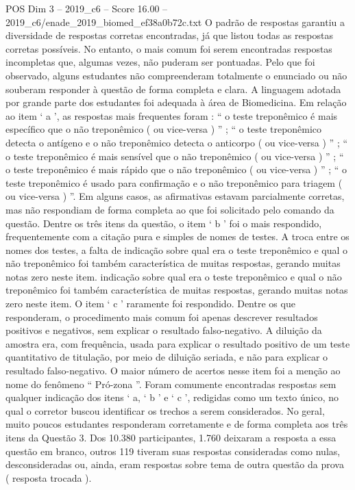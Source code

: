 \begin{textsample}{POS Dim 3 – 2019\_c6 – Score 16.00 – 2019\_c6/enade\_2019\_biomed\_ef38a0b72c.txt}
O padrão de respostas garantiu a diversidade de respostas corretas encontradas, já que listou todas as respostas corretas possíveis.
No entanto, o mais comum foi serem encontradas respostas incompletas que, algumas vezes, não puderam ser pontuadas.
Pelo que foi observado, alguns estudantes não compreenderam totalmente o enunciado ou não souberam responder à questão de forma completa e clara.
A linguagem adotada por grande parte dos estudantes foi adequada à área de Biomedicina.
Em relação ao item ‘ a ’, as respostas mais frequentes foram : “ o teste treponêmico é mais específico que o não treponêmico ( ou vice-versa ) ” ; “ o teste treponêmico detecta o antígeno e o não treponêmico detecta o anticorpo ( ou vice-versa ) ” ; “ o teste treponêmico é mais sensível que o não treponêmico ( ou vice-versa ) ” ; “ o teste treponêmico é mais rápido que o não treponêmico ( ou vice-versa ) ” ; “ o teste treponêmico é usado para confirmação e o não treponêmico para triagem ( ou vice-versa ) ”.
Em alguns casos, as afirmativas estavam parcialmente corretas, mas não respondiam de forma completa ao que foi solicitado pelo comando da questão.
Dentre os três itens da questão, o item ‘ b ’ foi o mais respondido, frequentemente com a citação pura e simples de nomes de testes.
A troca entre os nomes dos testes, a falta de indicação sobre qual era o teste treponêmico e qual o não treponêmico foi também característica de muitas respostas, gerando muitas notas zero neste item. indicação sobre qual era o teste treponêmico e qual o não treponêmico foi também característica de muitas respostas, gerando muitas notas zero neste item.
O item ‘ c ’ raramente foi respondido.
Dentre os que responderam, o procedimento mais comum foi apenas descrever resultados positivos e negativos, sem explicar o resultado falso-negativo.
A diluição da amostra era, com frequência, usada para explicar o resultado positivo de um teste quantitativo de titulação, por meio de diluição seriada, e não para explicar o resultado falso-negativo.
O maior número de acertos nesse item foi a menção ao nome do fenômeno “ Pró-zona ”.
Foram comumente encontradas respostas sem qualquer indicação dos itens ‘ a, ‘ b ’ e ‘ c ’, redigidas como um texto único, no qual o corretor buscou identificar os trechos a serem considerados.
No geral, muito poucos estudantes responderam corretamente e de forma completa aos três itens da Questão 3.
Dos 10.380 participantes, 1.760 deixaram a resposta a essa questão em branco, outros 119 tiveram suas respostas consideradas como nulas, desconsideradas ou, ainda, eram respostas sobre tema de outra questão da prova ( resposta trocada ).

\end{textsample}
